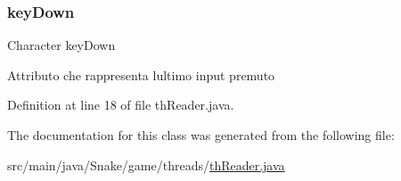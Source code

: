 \subsubsection{\texorpdfstring{key\+Down}{keyDown}}
{\footnotesize\ttfamily Character key\+Down\hspace{0.3cm}{\ttfamily [private]}}

Attributo che rappresenta l\textquotesingle{}ultimo input premuto 

Definition at line 18 of file th\+Reader.\+java.



The documentation for this class was generated from the following file\+:\begin{DoxyCompactItemize}
\item 
src/main/java/\+Snake/game/threads/\mbox{\hyperlink{th_reader_8java}{th\+Reader.\+java}}\end{DoxyCompactItemize}
